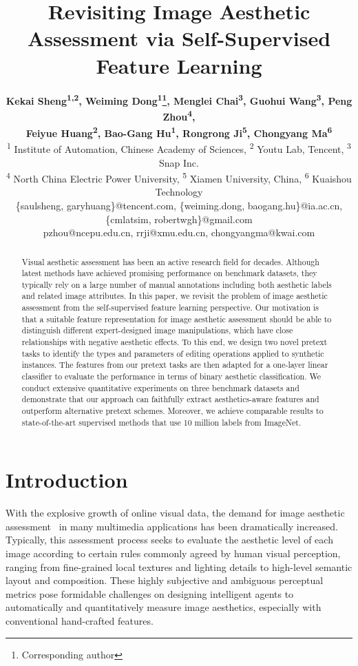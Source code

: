 \documentclass[letterpaper]{article}
\title{Revisiting Image Aesthetic Assessment via Self-Supervised Feature Learning}
\author{\textbf{Kekai Sheng\textsuperscript{\rm 1,2}, Weiming Dong\textsuperscript{\rm 1}\thanks{Corresponding author}, Menglei Chai\textsuperscript{\rm 3}, Guohui Wang\textsuperscript{\rm 3}, Peng Zhou\textsuperscript{\rm 4},} \\
\Large \textbf{Feiyue Huang\textsuperscript{\rm 2}, Bao-Gang Hu\textsuperscript{\rm 1}, Rongrong Ji\textsuperscript{\rm 5}, Chongyang Ma\textsuperscript{\rm 6}} \\
\textsuperscript{\rm 1} Institute of Automation, Chinese Academy of Sciences,
\hspace{5pt}
\textsuperscript{\rm 2} Youtu Lab, Tencent,
\hspace{5pt}
\textsuperscript{\rm 3} Snap Inc. \\
\textsuperscript{\rm 4} North China Electric Power University,
\hspace{5pt}
\textsuperscript{\rm 5} Xiamen University, China,
\hspace{5pt}
\textsuperscript{\rm 6} Kuaishou Technology \\
\{saulsheng, garyhuang\}@tencent.com, \{weiming.dong, baogang.hu\}@ia.ac.cn, \{cmlatsim, robertwgh\}@gmail.com \\
pzhou@ncepu.edu.cn, rrji@xmu.edu.cn, chongyangma@kwai.com
}
\begin{document}
\maketitle

\begin{abstract}
Visual aesthetic assessment has been an active research field for decades.
Although latest methods have achieved promising performance on benchmark datasets, they typically rely on a large number of manual annotations including both aesthetic labels and related image attributes.
In this paper, we revisit the problem of image aesthetic assessment from the self-supervised feature learning perspective.
Our motivation is that a suitable feature representation for image aesthetic assessment should be able to distinguish different expert-designed image manipulations, which have close relationships with negative aesthetic effects.
To this end, we design two novel pretext tasks to identify the types and parameters of editing operations applied to synthetic instances.
The features from our pretext tasks are then adapted for a one-layer linear classifier to evaluate the performance in terms of binary aesthetic classification.
We conduct extensive quantitative experiments on three benchmark datasets and demonstrate that our approach can faithfully extract aesthetics-aware features and outperform alternative pretext schemes.
Moreover, we achieve comparable results to state-of-the-art supervised methods that use 10 million labels from ImageNet.
\end{abstract}

\section{Introduction}

With the explosive growth of online visual data, the demand for image aesthetic assessment~\cite{datta2006studying} in many multimedia applications has been dramatically increased. Typically, this assessment process seeks to evaluate the aesthetic level of each image according to certain rules commonly agreed by human visual perception, ranging from fine-grained local textures and lighting details to high-level semantic layout and composition. These highly subjective and ambiguous perceptual metrics pose formidable challenges on designing intelligent agents to automatically and quantitatively measure image aesthetics, especially with conventional hand-crafted features.
\end{document}
